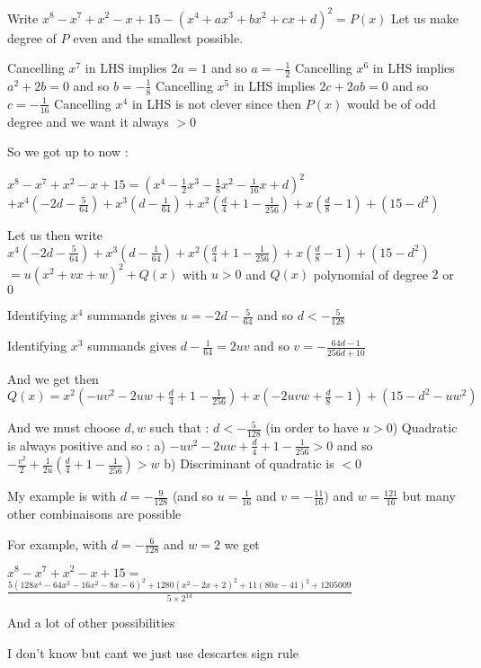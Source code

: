 \begin{solution}
	Write $x^8-x^7+x^2-x+15-(x^4+ax^3+bx^2+cx+d)^2=P(x)$
Let us make degree of $P$ even and the smallest possible.

Cancelling $x^7$ in LHS implies $2a=1$ and so $a=-\frac 12$
Cancelling $x^6$ in LHS implies $a^2+2b=0$ and so $b=-\frac 18$
Cancelling $x^5$ in LHS implies $2c+2ab=0$ and so $c=-\frac 1{16}$
Cancelling $x^4$ in LHS is not clever since then $P(x)$ would be of odd degree and we want it always $>0$

So we got up to now :

$x^8-x^7+x^2-x+15=(x^4-\frac 12x^3-\frac 18x^2-\frac 1{16}x+d)^2$ $+x^4(-2d-\frac 5{64})+x^3(d-\frac 1{64})+x^2(\frac d4+1-\frac 1{256})+x(\frac d8-1)+(15-d^2)$

Let us then write 
$x^4(-2d-\frac 5{64})+x^3(d-\frac 1{64})+x^2(\frac d4+1-\frac 1{256})+x(\frac d8-1)+(15-d^2)$ $=u(x^2+vx+w)^2+Q(x)$ with $u>0$ and $Q(x)$ polynomial of degree $2$ or $0$

Identifying $x^4$ summands gives $u=-2d-\frac 5{64}$ and so $d<-\frac 5{128}$

Identifying $x^3$ summands gives $d-\frac 1{64}=2uv$ and so $v=-\frac{64d-1}{256d+10}$

And we get then $Q(x)=x^2(-uv^2-2uw+\frac d4+1-\frac 1{256})+x(-2uvw+\frac d8-1)+(15-d^2-uw^2)$

And we must choose $d,w$ such that :
$d<-\frac 5{128}$ (in order to have $u>0$)
Quadratic is always positive and so :
a) $-uv^2-2uw+\frac d4+1-\frac 1{256}>0$ and so $-\frac{v^2}2+\frac 1{2u}(\frac d4+1-\frac 1{256})>w$
b) Discriminant of quadratic is $<0$

My example is with $d=-\frac 9{128}$ (and so $u=\frac 1{16}$ and $v=-\frac {11}{16}$) and $w=\frac{121}{16}$ but many other combinaisons are possible

For example, with $d=-\frac 6{128}$ and $w=2$ we get 

$x^8-x^7+x^2-x+15=$ $\frac{5(128x^4-64x^3-16x^2-8x-6)^2+1280(x^2-2x+2)^2+11(80x-41)^2+1205009}{5\times 2^{14}}$

And a lot of other possibilities
\end{solution}



\begin{solution}
	I don't know but cant we just use descartes sign rule
\end{solution}



